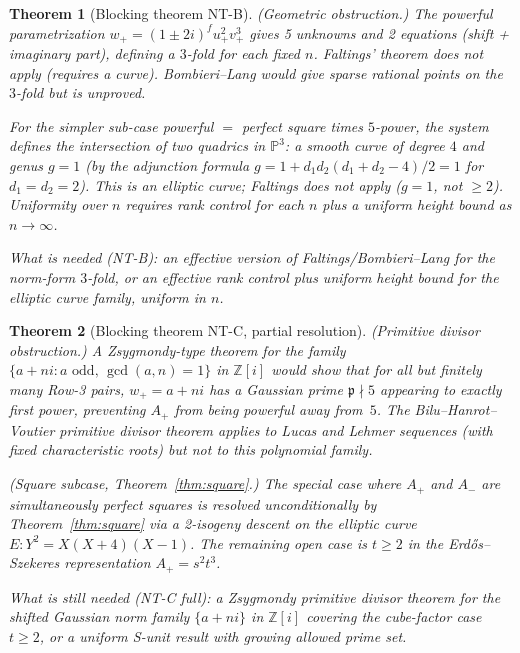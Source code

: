 \documentclass[12pt]{amsart}
\theoremstyle{plain}
\newtheorem{theorem}{Theorem}[section]
\theoremstyle{definition}
\theoremstyle{remark}
\newcommand{\Zi}{\mathbb{Z}[i]}
\newcommand{\Aplus}{A_{+}}
\newcommand{\Aminus}{A_{-}}
\begin{document}
\begin{theorem}[Blocking theorem NT-B]
\label{thm:NTB}
\textup{(Geometric obstruction.)}
The powerful parametrization
$w_{+}=(1\pm 2i)^{f}u_{+}^2 v_{+}^3$ gives 5 unknowns and 2 equations
(shift + imaginary part), defining a \emph{$3$-fold} for each fixed $n$.
Faltings' theorem \cite{Faltings1983} does not apply (requires a curve).
Bombieri--Lang would give sparse rational points on the $3$-fold but is
unproved.

For the simpler sub-case powerful $=$ perfect square times $5$-power,
the system defines the intersection of two quadrics in $\mathbb{P}^3$:
a smooth curve of degree $4$ and genus $g=1$ (by the adjunction formula
$g=1+d_1 d_2(d_1+d_2-4)/2 = 1$ for $d_1=d_2=2$).
This is an elliptic curve; Faltings does not apply ($g=1$, not $\geq 2$).
Uniformity over $n$ requires rank control for each $n$ plus a
uniform height bound as $n\to\infty$.

\medskip
\noindent\emph{What is needed} \textup{(NT-B)}: an effective version of
Faltings/Bombieri--Lang for the norm-form $3$-fold, or an effective rank
control plus uniform height bound for the elliptic curve family, uniform in $n$.
\end{theorem}

\begin{theorem}[Blocking theorem NT-C, partial resolution]
\label{thm:NTC}
\textup{(Primitive divisor obstruction.)}
A Zsygmondy-type theorem for the family $\{a+ni : a\text{ odd},\,\gcd(a,n)=1\}$
in $\Zi$ would show that for all but finitely many Row-3 pairs,
$w_{+}=a+ni$ has a Gaussian prime $\mathfrak{p}\nmid 5$ appearing to
exactly first power, preventing $\Aplus$ from being powerful away from~$5$.
The Bilu--Hanrot--Voutier primitive divisor theorem \cite{Bilu2001} applies to Lucas and
Lehmer sequences (with fixed characteristic roots) but not to this
polynomial family.

\textup{(Square subcase, Theorem~\ref{thm:square}.)}  The special case where $\Aplus$ and
$\Aminus$ are simultaneously perfect squares is resolved unconditionally by
Theorem~\ref{thm:square} via a 2-isogeny descent on the elliptic curve
$E: Y^2 = X(X+4)(X-1)$.  The remaining open case is $t\geq 2$ in the
Erd\H{o}s--Szekeres representation $\Aplus = s^2 t^3$.

\medskip
\noindent\emph{What is still needed} \textup{(NT-C full)}: a Zsygmondy primitive
divisor theorem for the shifted Gaussian norm family $\{a+ni\}$ in $\Zi$
covering the cube-factor case $t\geq 2$, or a uniform S-unit result with
growing allowed prime set.
\end{theorem}
\end{document}
